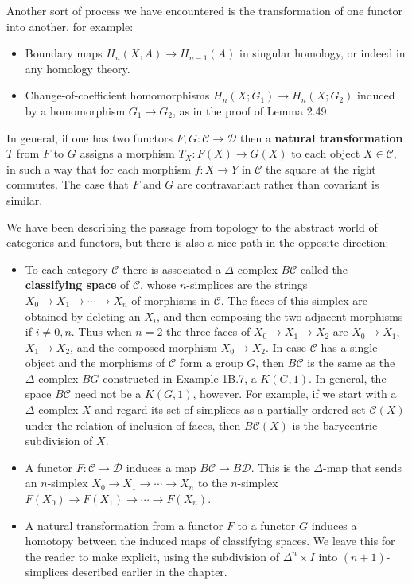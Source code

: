Another sort of process we have encountered is the transformation of one functor into another, for example:

\begin{itemize}
\item Boundary maps $H_n(X,A) \to H_{n-1}(A)$ in singular homology, or indeed in any homology theory.
\end{itemize}

\begin{itemize}
\item Change-of-coefficient homomorphisms $H_n(X;G_1) \to H_n(X;G_2)$ induced by a homomorphism $G_1 \to G_2$, as in the proof of Lemma 2.49.
\end{itemize}

In general, if one has two functors $F, G: \mathcal{C} \to \mathcal{D}$ then a \textbf{natural transformation} $T$ from $F$ to $G$ assigns a morphism $T_X: F(X) \to G(X)$ to each object $X \in \mathcal{C}$, in such a way that for each morphism $f: X \to Y$ in $\mathcal{C}$ the square at the right commutes. The case that $F$ and $G$ are contravariant rather than covariant is similar.



We have been describing the passage from topology to the abstract world of categories and functors, but there is also a nice path in the opposite direction:

\begin{itemize}
\item To each category $\mathcal{C}$ there is associated a $\Delta$-complex $B\mathcal{C}$ called the \textbf{classifying space} of $\mathcal{C}$, whose $n$-simplices are the strings $X_0 \to X_1 \to \cdots \to X_n$ of morphisms in $\mathcal{C}$. The faces of this simplex are obtained by deleting an $X_i$, and then composing the two adjacent morphisms if $i \neq 0, n$. Thus when $n = 2$ the three faces of $X_0 \to X_1 \to X_2$ are $X_0 \to X_1$, $X_1 \to X_2$, and the composed morphism $X_0 \to X_2$. In case $\mathcal{C}$ has a single object and the morphisms of $\mathcal{C}$ form a group $G$, then $B\mathcal{C}$ is the same as the $\Delta$-complex $BG$ constructed in Example 1B.7, a $K(G, 1)$. In general, the space $B\mathcal{C}$ need not be a $K(G, 1)$, however. For example, if we start with a $\Delta$-complex $X$ and regard its set of simplices as a partially ordered set $\mathcal{C}(X)$ under the relation of inclusion of faces, then $B\mathcal{C}(X)$ is the barycentric subdivision of $X$.

\item A functor $F: \mathcal{C} \to \mathcal{D}$ induces a map $B\mathcal{C} \to B\mathcal{D}$. This is the $\Delta$-map that sends an $n$-simplex $X_0 \to X_1 \to \cdots \to X_n$ to the $n$-simplex $F(X_0) \to F(X_1) \to \cdots \to F(X_n)$.

\item A natural transformation from a functor $F$ to a functor $G$ induces a homotopy between the induced maps of classifying spaces. We leave this for the reader to make explicit, using the subdivision of $\Delta^n \times I$ into $(n + 1)$-simplices described earlier in the chapter.
\end{itemize}

